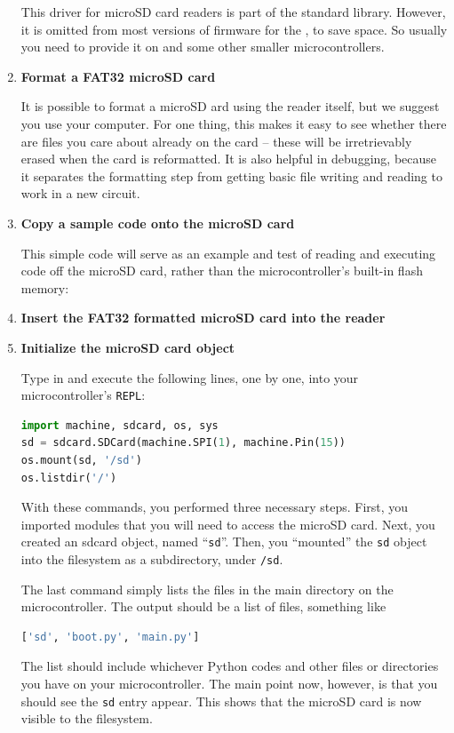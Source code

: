 \begin{enumerate}
	This driver for \spi microSD card readers is part of the standard \Micropython library.
	However, it is omitted from most versions of firmware for the , to save space.
	So usually you need to provide it on  and some other smaller microcontrollers.

	\item \textbf{Format a FAT32 microSD card}

	It is possible to format a microSD ard using the reader itself, but we suggest you use your computer.
	For one thing, this makes it easy to see whether there are files you care about already on the card -- these will be irretrievably erased when the card is reformatted.
	It is also helpful in debugging, because it separates the formatting step from getting basic file writing and reading to work in a new circuit.

	\item \textbf{Copy a sample code onto the microSD card}

	This simple code will serve as an example and test of reading and executing code off the microSD card, rather than the microcontroller's built-in flash memory:
	

	\item \textbf{Insert the FAT32 formatted microSD card into the reader}

	\item \textbf{Initialize the microSD card object}

	Type in and execute the following lines, one by one, into your microcontroller's \texttt{REPL}:
\begin{lstlisting}[language=Python]
import machine, sdcard, os, sys
sd = sdcard.SDCard(machine.SPI(1), machine.Pin(15))
os.mount(sd, '/sd')
os.listdir('/')
\end{lstlisting}
  With these commands, you performed three necessary steps.
  First, you imported modules that you will need to access the microSD card.
  Next, you created an sdcard object, named ``\texttt{sd}''.
  Then, you ``mounted'' the \texttt{sd} object into the filesystem as a subdirectory, under \texttt{/sd}.

  \smallskip
	The last command simply lists the files in the main directory on the microcontroller.
  The output should be a list of files, something like
\begin{lstlisting}[language=Python]
 ['sd', 'boot.py', 'main.py']
\end{lstlisting}
 The list should include whichever Python codes and other files or directories you have on your microcontroller.
 The main point now, however, is that you should see the \texttt{sd} entry appear.
 This shows that the microSD card is now visible to the filesystem.


\end{enumerate}
